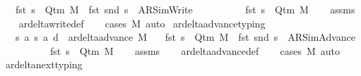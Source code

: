 \begin{isabellebody}
\ \ \ {\isachardoublequoteopen}fst\ s\ {\isasymin}\ Q{\isacharunderscore}{\kern0pt}tm\ M\ {\isasymand}\ fst\ {\isacharparenleft}{\kern0pt}snd\ s{\isacharparenright}{\kern0pt}\ {\isacharequal}{\kern0pt}\ AR{\isacharunderscore}{\kern0pt}SimWrite\isanewline
\ \ \ \ \ \ \ \ \ {\isasymand}\ fst\ s{\isacharprime}{\kern0pt}\ {\isasymin}\ Q{\isacharunderscore}{\kern0pt}tm\ M{\isachardoublequoteclose}\isanewline
%
\isadelimproof
\ \ %
\endisadelimproof
%
\isatagproof
{}\isamarkupfalse%
\ assms\isanewline
\ \ \isamarkupfalse%
\ ar{\isacharunderscore}{\kern0pt}delta{\isacharunderscore}{\kern0pt}write{\isacharunderscore}{\kern0pt}def\isanewline
\ \ \isamarkupfalse%
\ {\isacharparenleft}{\kern0pt}cases\ M{\isacharparenright}{\kern0pt}\ auto%
\endisatagproof
{\isafoldproof}%
%
\isadelimproof
\isanewline
%
\endisadelimproof
\isanewline
{}\isamarkupfalse%
\ ar{\isacharunderscore}{\kern0pt}delta{\isacharunderscore}{\kern0pt}advance{\isacharunderscore}{\kern0pt}typing{\isacharcolon}{\kern0pt}\isanewline
\ \ \ {\isachardoublequoteopen}{\isacharparenleft}{\kern0pt}s{\isacharcomma}{\kern0pt}\ a{\isacharcomma}{\kern0pt}\ s{\isacharprime}{\kern0pt}{\isacharcomma}{\kern0pt}\ a{\isacharprime}{\kern0pt}{\isacharcomma}{\kern0pt}\ d{\isacharparenright}{\kern0pt}\ {\isasymin}\ ar{\isacharunderscore}{\kern0pt}delta{\isacharunderscore}{\kern0pt}advance\ M{\isachardoublequoteclose}\isanewline
\ \ \ {\isachardoublequoteopen}fst\ s\ {\isasymin}\ Q{\isacharunderscore}{\kern0pt}tm\ M\ {\isasymand}\ fst\ {\isacharparenleft}{\kern0pt}snd\ s{\isacharparenright}{\kern0pt}\ {\isacharequal}{\kern0pt}\ AR{\isacharunderscore}{\kern0pt}SimAdvance\isanewline
\ \ \ \ \ \ \ \ \ {\isasymand}\ fst\ s{\isacharprime}{\kern0pt}\ {\isasymin}\ Q{\isacharunderscore}{\kern0pt}tm\ M{\isachardoublequoteclose}\isanewline
%
\isadelimproof
\ \ %
\endisadelimproof
%
\isatagproof
{}\isamarkupfalse%
\ assms\isanewline
\ \ \isamarkupfalse%
\ ar{\isacharunderscore}{\kern0pt}delta{\isacharunderscore}{\kern0pt}advance{\isacharunderscore}{\kern0pt}def\isanewline
\ \ \isamarkupfalse%
\ {\isacharparenleft}{\kern0pt}cases\ M{\isacharparenright}{\kern0pt}\ auto%
\endisatagproof
{\isafoldproof}%
%
\isadelimproof
\isanewline
%
\endisadelimproof
\isanewline
{}\isamarkupfalse%
\ ar{\isacharunderscore}{\kern0pt}delta{\isacharunderscore}{\kern0pt}next{\isacharunderscore}{\kern0pt}typing{\isacharcolon}{\kern0pt}\isanewline

\end{isabellebody}
